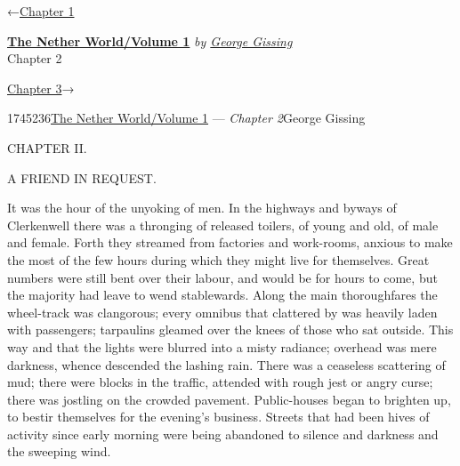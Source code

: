 \hypertarget{headerContainer}{}
\hypertarget{navigationHeader}{}
\protect\hypertarget{headerprevious}{}{←\href{/wiki/The_Nether_World/Volume_1/Chapter_1}{Chapter
1}}

\textbf{\protect\hypertarget{header_title_text}{}{\href{/w/index.php?title=The_Nether_World/Volume_1\&action=edit\&redlink=1}{The
Nether World/Volume 1}}} \emph{by
\href{/wiki/Author:George_Gissing}{\protect\hypertarget{header_author_text}{}{{George
Gissing}}}}\\
\protect\hypertarget{header_section_text}{}{Chapter 2}

\protect\hypertarget{headernext}{}{\href{/wiki/The_Nether_World/Volume_1/Chapter_3}{Chapter
3}→}

\hypertarget{navigationNotes}{}

\hypertarget{ws-data}{}
\protect\hypertarget{ws-article-id}{}{1745236}\protect\hypertarget{ws-title}{}{\href{/w/index.php?title=The_Nether_World/Volume_1\&action=edit\&redlink=1}{The
Nether World/Volume 1} --- \emph{Chapter
2}}\protect\hypertarget{ws-author}{}{George Gissing}

{\protect\hypertarget{23}{}{}}

{CHAPTER II.}

A FRIEND IN REQUEST.

It was the hour of the unyoking of men. In the highways and byways of
Clerkenwell there was a thronging of released toilers, of young and old,
of male and female. Forth they streamed from factories and work-rooms,
anxious to make the most of the few hours during which they might live
for themselves. Great numbers were still bent over their labour, and
would be for hours to come, but the majority had leave to wend
stablewards. Along the main thoroughfares the wheel-track was
clangorous; every omnibus that clattered by was heavily laden with
passengers; tarpaulins gleamed over the knees of those who sat outside.
This way and that the lights were blurred into a misty radiance;
overhead was mere {\protect\hypertarget{24}{}{}}darkness, whence
descended the lashing rain. There was a ceaseless scattering of mud;
there were blocks in the traffic, attended with rough jest or angry
curse; there was jostling on the crowded pavement. Public-houses began
to brighten up, to bestir themselves for the evening's business. Streets
that had been hives of activity since early morning were being abandoned
to silence and darkness and the sweeping wind.

